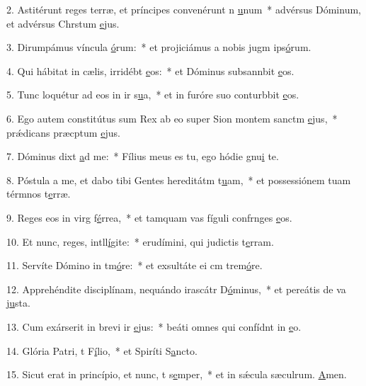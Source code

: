 2. Astitérunt reges terræ, et príncipes convenérunt n \uline{u}num~* advérsus Dóminum, et advérsus Chrstum \uline{e}jus.\par 
3. Dirumpámus víncula \uline{ó}rum:~* et projiciámus a nobis jugm ips\uline{ó}rum.\par 
4. Qui hábitat in cælis, irridébt \uline{e}os:~* et Dóminus subsannbit \uline{e}os.\par 
5. Tunc loquétur ad eos in ir s\uline{u}a,~* et in furóre suo conturbbit \uline{e}os.\par 
6. Ego autem constitútus sum Rex ab eo super Sion montem sanctm \uline{e}jus,~* prǽdicans præcptum \uline{e}jus.\par 
7. Dóminus dixt \uline{a}d me:~* Fílius meus es tu, ego hódie gnu\uline{i} te.\par 
8. Póstula a me, et dabo tibi Gentes hereditátm t\uline{u}am,~* et possessiónem tuam térmnos t\uline{e}rræ.\par 
9. Reges eos in virg f\uline{é}rrea,~* et tamquam vas fíguli confrnges \uline{e}os.\par 
10. Et nunc, reges, intll\uline{í}gite:~* erudímini, qui judictis t\uline{e}rram.\par 
11. Servíte Dómino in tm\uline{ó}re:~* et exsultáte ei cm trem\uline{ó}re.\par 
12. Apprehéndite disciplínam, nequándo irascátr D\uline{ó}minus,~* et pereátis de va j\uline{u}sta.\par 
13. Cum exárserit in brevi ir \uline{e}jus:~* beáti omnes qui confídnt in \uline{e}o.\par 
14. Glória Patri, t F\uline{í}lio,~* et Spiríti S\uline{a}ncto.\par 
15. Sicut erat in princípio, et nunc, t s\uline{e}mper,~* et in sǽcula sæculrum. \uline{A}men.\par 
